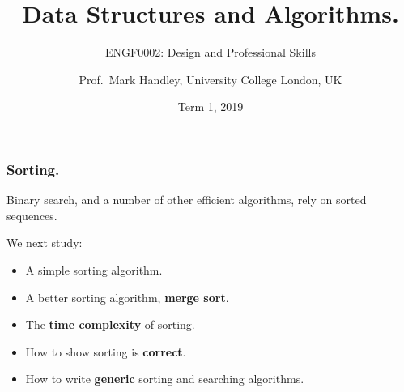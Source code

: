 \documentclass{beamer} %
\author{Prof.\ Mark Handley, University College London, UK}
\title{Data Structures and Algorithms.}
\subtitle{ENGF0002: Design and Professional Skills }
\date{Term 1, 2019}
\newcommand\emc[1]{\textcolor{midred}{\textbf{#1}}}
\begin{document}
\nobibliography*


\frame{
\titlepage
}

\begin{frame}
\frametitle{Sorting.}

Binary search, and a number of other efficient algorithms, rely on sorted sequences. 

\vspace{3mm}
We next study:
\begin{itemize}
	\item A simple sorting algorithm. %
	\item A better sorting algorithm, \emc{merge sort}.
	\item The \emc{time complexity} of sorting.
	\item How to show sorting is \emc{correct}.
	\item How to write \emc{generic} sorting and searching algorithms.
\end{itemize}

\end{frame}
\end{document}
